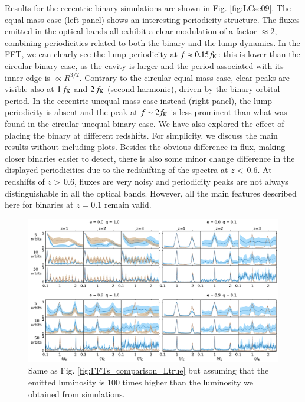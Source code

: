 \documentclass{aa}
\newcommand{\as}[1]{\textcolor{magenta}{\bf [AS: #1]}}
\begin{document}
Results for the eccentric binary simulations are shown in Fig. \ref{fig:LCse09}. The equal-mass case (left panel) shows an interesting periodicity structure. The fluxes emitted in the optical bands all exhibit a clear modulation of a factor $\approx2$, combining periodicities related to both the binary and the lump dynamics. In the FFT, we can clearly see the lump periodicity at $f\approx 0.15f_{\rm K}$: this is lower than the circular binary case, as the cavity is larger and the period associated with its inner edge is $\propto R^{3/2}$. Contrary to the circular equal-mass case, clear peaks are visible also at $1\,f_{\rm K}$ and $2\,f_{\rm K}$ (second harmonic), driven by the binary orbital period. %
In the eccentric unequal-mass case instead (right panel), the lump periodicity is absent and the peak at $f\sim 2 f_{\rm K}$ is less prominent than what was found in the circular unequal binary case.
We have also explored the effect of placing the binary at different redshifts. For simplicity, we discuss the main results without including plots. Besides the obvious difference in flux, making closer binaries easier to detect, there is also some minor change difference in the displayed periodicities due to the redshifting of the spectra at $z<\,0.6$. At redshifts of $z>\,0.6$, fluxes are very noisy and periodicity peaks are not always distinguishable in all the optical bands. However, all the main features described here for binaries at $z=0.1$ remain valid.

\begin{figure}
    \begin{center}
    \includegraphics[width=18cm]{Figures/e09q01_hr01_md001_3aOptic_FFTmean_bands_comparison_periods_GFILTER_7_L100.pdf}
    \caption{Same as Fig. \ref{fig:FFTs_comparison_Ltrue} but assuming that the emitted luminosity is 100 times higher than the luminosity we obtained from simulations. 
    }
    \label{fig:FFTs_comparison_L100}
        \end{center}
\end{figure}
\end{document}
